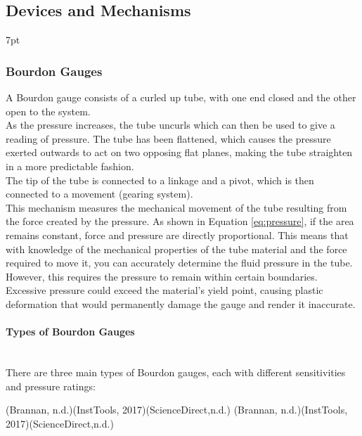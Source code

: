 \documentclass{article}
\newcommand{\formalsource}{} %
\newenvironment{formal}[3][]{%
	\renewcommand{\formalsource}{#1}%
	\def\FrameCommand{%
		\hspace{1pt}%
		{\color{#2}\vrule width 2pt}%
		{\color{#3}\vrule width 4pt}%
		\colorbox{#3}%
	}%
	\MakeFramed{\advance\hsize-\width\FrameRestore}%
	\noindent\hspace{-4.55pt}%
	\begin{adjustwidth}{}{7pt}%
		\vspace{2pt}%
	}%
	{%
		\vspace{4pt}%
		\ifx\formalsource\empty %
		\else
		\hfill{\footnotesize{\formalsource}}%
		\fi
	\end{adjustwidth}\endMakeFramed%
}
\begin{document}
\subsection{Devices and Mechanisms}
\begin{formal}[(Brannan, n.d.)(InstTools, 2017)(ScienceDirect,n.d.)]{black!60!white}{white}
\vspace{-1em}
\subsubsection{Bourdon Gauges}	
A Bourdon gauge consists of a curled up tube, with one end closed and the other open to the system.\\[8pt] 
As the pressure increases, the tube uncurls which can then be used to give a reading of pressure. The tube has been flattened, which causes the pressure exerted outwards to act on two opposing flat planes, making the tube straighten in a more predictable fashion.\\[8pt]
The tip of the tube is connected to a linkage and a pivot, which is then connected to a movement (gearing system).\\[8pt]
This mechanism measures the mechanical movement of the tube resulting from the force created by the pressure. As shown in Equation \ref{eq:pressure}, if the area remains constant, force and pressure are directly proportional. This means that with knowledge of the mechanical properties of the tube material and the force required to move it, you can accurately determine the fluid pressure in the tube.\\[8pt] 
However, this requires the pressure to remain within certain boundaries. Excessive pressure could exceed the material's yield point, causing plastic deformation that would permanently damage the gauge and render it inaccurate.\\\vspace{-2em}
\paragraph{Types of Bourdon Gauges}\mbox{}\\[8pt]
There are three main types of Bourdon gauges, each with different sensitivities and pressure ratings:


\end{formal}
\end{document}
